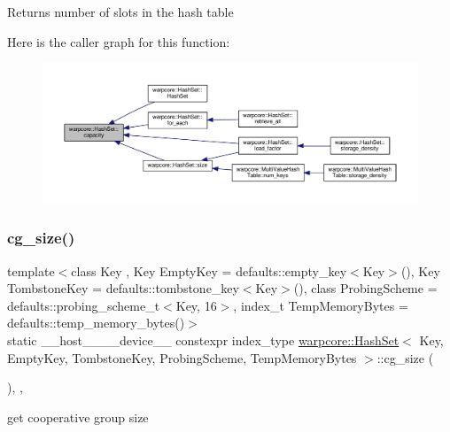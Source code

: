 \begin{DoxyReturn}{Returns}
number of slots in the hash table 
\end{DoxyReturn}
Here is the caller graph for this function\+:
\nopagebreak
\begin{figure}[H]
\begin{center}
\leavevmode
\includegraphics[width=350pt]{classwarpcore_1_1HashSet_a6edef2d260c214f294b61bb394a11545_icgraph}
\end{center}
\end{figure}
\mbox{\label{classwarpcore_1_1HashSet_a0906259ae0be4a4f6f9ba74b4874e542}} 
\subsubsection{\texorpdfstring{cg\+\_\+size()}{cg\_size()}}
{\footnotesize\ttfamily template$<$class Key , Key Empty\+Key = defaults\+::empty\+\_\+key$<$\+Key$>$(), Key Tombstone\+Key = defaults\+::tombstone\+\_\+key$<$\+Key$>$(), class Probing\+Scheme  = defaults\+::probing\+\_\+scheme\+\_\+t$<$\+Key, 16$>$, index\+\_\+t Temp\+Memory\+Bytes = defaults\+::temp\+\_\+memory\+\_\+bytes()$>$ \\
static \+\_\+\+\_\+host\+\_\+\+\_\+\+\_\+\+\_\+device\+\_\+\+\_\+ constexpr index\+\_\+type \hyperlink{classwarpcore_1_1HashSet}{warpcore\+::\+Hash\+Set}$<$ Key, Empty\+Key, Tombstone\+Key, Probing\+Scheme, Temp\+Memory\+Bytes $>$\+::cg\+\_\+size (\begin{DoxyParamCaption}{ }\end{DoxyParamCaption})\hspace{0.3cm}{\ttfamily [inline]}, {\ttfamily [static]}, {\ttfamily [noexcept]}}



get cooperative group size 

